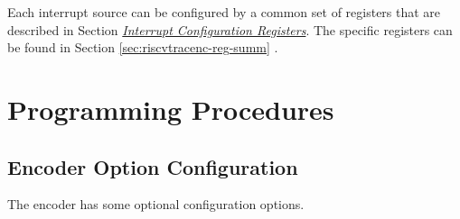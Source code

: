 \documentclass[main\_\_EN.tex]{subfiles}
\begin{document}
Each interrupt source can be configured by a common set of registers that are described in Section \hyperref[interrupt-config-registers]{\textit{Interrupt Configuration Registers}}. The specific registers can be found in Section \ref{sec:riscvtracenc-reg-summ} \textit{}.


\section{Programming Procedures}
\label{sec:riscvtracenc-prog-procedures}

\subsection{Encoder Option Configuration}
The encoder has some optional configuration options.
\end{document}
